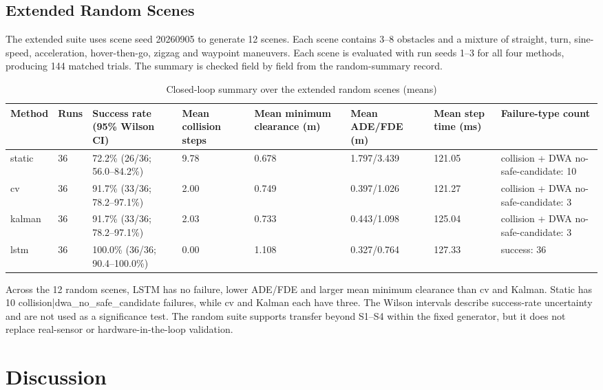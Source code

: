\documentclass[10pt,a4paper]{article}
\begin{document}
\subsection{Extended Random Scenes}

The extended suite uses scene seed 20260905 to generate 12 scenes. Each scene contains 3–8 obstacles and a mixture of straight, turn, sine-speed, acceleration, hover-then-go, zigzag and waypoint maneuvers. Each scene is evaluated with run seeds 1–3 for all four methods, producing 144 matched trials. The summary is checked field by field from the random-summary record.

\begin{table}[t]
\centering
\small
\caption{Closed-loop summary over the extended random scenes (means)}
\label{tab:table-9}
\begin{tabularx}{\linewidth}{YYYYYYYY}
\toprule
Method & Runs & Success rate (95\% Wilson CI) & Mean collision steps & Mean minimum clearance (m) & Mean ADE/FDE (m) & Mean step time (ms) & Failure-type count \\
\midrule
static & 36 & 72.2\% (26/36; 56.0–84.2\%) & 9.78 & 0.678 & 1.797/3.439 & 121.05 & collision + DWA no-safe-candidate: 10 \\
cv & 36 & 91.7\% (33/36; 78.2–97.1\%) & 2.00 & 0.749 & 0.397/1.026 & 121.27 & collision + DWA no-safe-candidate: 3 \\
kalman & 36 & 91.7\% (33/36; 78.2–97.1\%) & 2.03 & 0.733 & 0.443/1.098 & 125.04 & collision + DWA no-safe-candidate: 3 \\
lstm & 36 & 100.0\% (36/36; 90.4–100.0\%) & 0.00 & 1.108 & 0.327/0.764 & 127.33 & success: 36 \\
\bottomrule
\end{tabularx}
\end{table}

Across the 12 random scenes, LSTM has no failure, lower ADE/FDE and larger mean minimum clearance than cv and Kalman. Static has 10 collision|dwa\_no\_safe\_candidate failures, while cv and Kalman each have three. The Wilson intervals describe success-rate uncertainty and are not used as a significance test. The random suite supports transfer beyond S1–S4 within the fixed generator, but it does not replace real-sensor or hardware-in-the-loop validation.

\section{Discussion}
\end{document}
